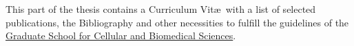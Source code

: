 
\pagestyle{empty}

\hfill

\vfill

This part of the thesis contains a Curriculum Vit\ae\ with a list of selected publications, the Bibliography and other necessities to fulfill the guidelines of the \href{http://www.gcb.unibe.ch/content/programme_description/phd_programme/phd_degree/index_eng.html}{Graduate School for Cellular and Biomedical Sciences}.

\vfill



\cleardoublepage